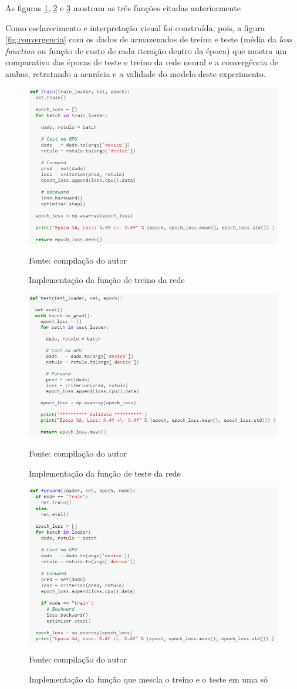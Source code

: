 As figuras \ref{fig:train}, \ref{fig:test} e \ref{fig:forward} mostram as três funções citadas anteriormente

Como esclarecimento e interpretação visual foi construída, pois, a figura \ref{fig:convergencia} com os dados de armazenados de treino e teste (média da \textit{loss function} ou função de custo de cada iteração dentro da época) que mostra um comparativo das épocas de teste e treino da rede neural e a convergência de ambas, retratando a acurácia e a validade do modelo deste experimento.

\begin{figure}[h!]
	\centering
	\includegraphics[width=.6\textwidth]{imagens/train.png}
	\caption{Implementação da função de treino da rede}
	\label{fig:train}
	{\scriptsize Fonte: compilação do autor}
\end{figure}

\begin{figure}[h!]
	\centering
	\includegraphics[width=.6\textwidth]{imagens/test.png}
	\caption{Implementação da função de teste da rede}
	\label{fig:test}
	{\scriptsize Fonte: compilação do autor}
\end{figure}

\begin{figure}[h!]
	\centering
	\includegraphics[width=.6\textwidth]{imagens/forward.png}
	\caption{Implementação da função que mescla o treino e o teste em uma só}
	\label{fig:forward}
	{\scriptsize Fonte: compilação do autor}
\end{figure}

